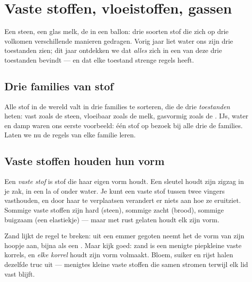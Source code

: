 \chapter{Vaste stoffen, vloeistoffen, gassen}\label{ch:g3:solids-liquids-gases}

Een steen, een glas melk, de  in een ballon: drie soorten stof
die zich op drie volkomen verschillende manieren gedragen. Vorig jaar
liet water ons zijn drie toestanden zien; dit jaar ontdekken we dat
\emph{alles} zich in een van deze drie toestanden bevindt --- en dat
elke toestand strenge regels heeft.

\section{Drie families van stof}

Alle stof in de wereld valt in drie families te sorteren, die de drie
\emph{toestanden} heten: vast zoals de steen, vloeibaar zoals de melk,
gasvormig zoals de . IJs, water en damp waren ons eerste
voorbeeld: één stof op bezoek bij alle drie de families. Laten we nu
de regels van elke familie leren.

\section{Vaste stoffen houden hun vorm}

\begin{definition}\label{def:g3:solids-liquids-gases:solid}
Een \emph{vaste stof} is stof die haar eigen vorm
houdt. Een sleutel houdt zijn zigzag in je zak, in een la of onder
water. Je kunt een vaste stof tussen twee vingers vasthouden, en door
haar te verplaatsen verandert er niets aan hoe ze eruitziet. Sommige
vaste stoffen zijn hard (steen), sommige zacht (brood), sommige
buigzaam (een elastiekje) --- maar met rust gelaten houdt elk zijn
vorm.
\end{definition}

\begin{example}\label{ex:g3:solids-liquids-gases:sand}
Zand lijkt de regel te breken: uit een emmer gegoten neemt het de vorm
van zijn hoopje aan, bijna als een . Maar kijk goed: zand is
een menigte piepkleine vaste korrels, en \emph{elke korrel} houdt zijn
vorm volmaakt. Bloem, suiker en rijst halen dezelfde truc uit ---
menigtes kleine vaste stoffen die samen stromen terwijl elk lid
vast blijft.
\end{example}

